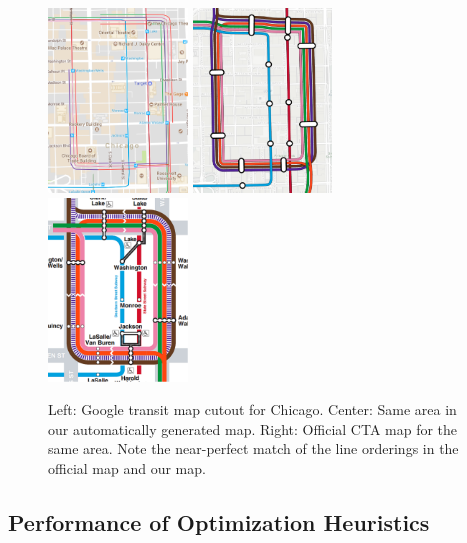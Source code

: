 \documentclass[sigconf]{acmart}
\begin{document}
\begin{figure}
\centering
\includegraphics[width=0.33\textwidth]{google.pdf}
\hfill
\includegraphics[width=0.33\textwidth]{loom.pdf}
\hfill
\includegraphics[width=0.33\textwidth]{chicago_loop.pdf}
\caption{Left: Google transit map cutout for Chicago. Center: Same area in our automatically generated map. Right: Official CTA map for the same area. Note the near-perfect match of the line orderings in the official map and our map.}
\label{FIG:chicagofull}  
\end{figure}


\subsection{Performance of Optimization Heuristics}
\end{document}
